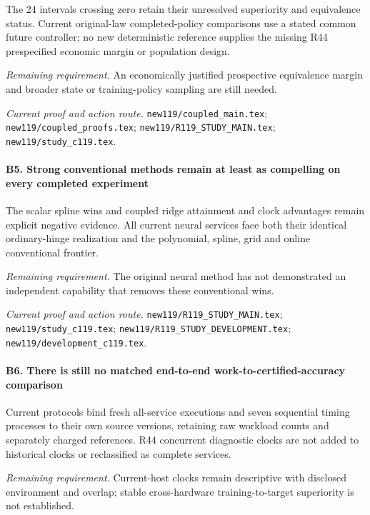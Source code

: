 The 24 intervals crossing zero retain their unresolved superiority and equivalence status. Current original-law completed-policy comparisons use a stated common future controller; no new deterministic reference supplies the missing R44 prespecified economic margin or population design.

\par\emph{Remaining requirement.} An economically justified prospective equivalence margin and broader state or training-policy sampling are still needed.

\par\emph{Current proof and action route.} \nolinkurl{new119/coupled_main.tex}; \nolinkurl{new119/coupled_proofs.tex}; \nolinkurl{new119/R119_STUDY_MAIN.tex}; \nolinkurl{new119/study_c119.tex}.

\paragraph{B5. Strong conventional methods remain at least as compelling on every completed experiment}

The scalar spline wins and coupled ridge attainment and clock advantages remain explicit negative evidence. All current neural services face both their identical ordinary-hinge realization and the polynomial, spline, grid and online conventional frontier.

\par\emph{Remaining requirement.} The original neural method has not demonstrated an independent capability that removes these conventional wins.

\par\emph{Current proof and action route.} \nolinkurl{new119/R119_STUDY_MAIN.tex}; \nolinkurl{new119/study_c119.tex}; \nolinkurl{new119/R119_STUDY_DEVELOPMENT.tex}; \nolinkurl{new119/development_c119.tex}.

\paragraph{B6. There is still no matched end-to-end work-to-certified-accuracy comparison}

Current protocols bind fresh all-service executions and seven sequential timing processes to their own source versions, retaining raw workload counts and separately charged references. R44 concurrent diagnostic clocks are not added to historical clocks or reclassified as complete services.

\par\emph{Remaining requirement.} Current-host clocks remain descriptive with disclosed environment and overlap; stable cross-hardware training-to-target superiority is not established.

